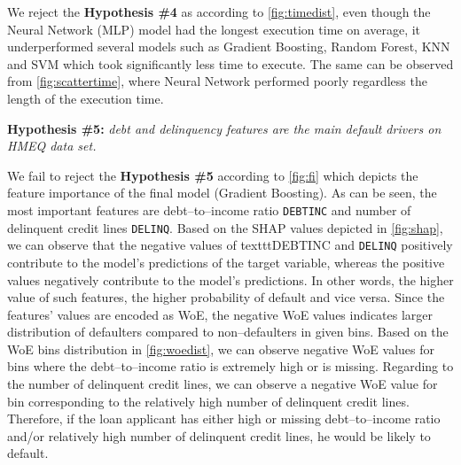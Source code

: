 We reject the \textbf{Hypothesis \#4} as according to \autoref{fig:timedist}, even though the Neural Network (MLP) model had the longest execution time on average, it underperformed several models such as Gradient Boosting, Random Forest, KNN and SVM which took significantly less time to execute. The same can be observed from \autoref{fig:scattertime}, where Neural Network performed poorly regardless the length of the execution time.
\vspace{0.3cm}

\noindent \textbf{Hypothesis \#5:} \textit{ debt and delinquency features are the main default drivers on HMEQ data set.}

We fail to reject the \textbf{Hypothesis \#5} according to \autoref{fig:fi} which depicts the feature importance of the final model (Gradient Boosting). As can be seen, the most important features are debt--to--income ratio \texttt{DEBTINC} and number of delinquent credit lines \texttt{DELINQ}.
Based on the SHAP values depicted in \autoref{fig:shap}, we can observe that the negative values of texttt{DEBTINC} and \texttt{DELINQ} positively contribute to the model's predictions of the target variable, whereas the positive values negatively contribute to the model's predictions.
In other words, the higher value of such features, the higher probability of default and vice versa.
Since the features' values are encoded as WoE, the negative WoE values indicates larger distribution of defaulters compared to non--defaulters in given bins.
Based on the WoE bins distribution in \autoref{fig:woedist}, we can observe negative WoE values for bins where the debt--to--income ratio is extremely high or is missing. Regarding to the number of delinquent credit lines, we can observe a negative WoE value for bin corresponding to the relatively high number of delinquent credit lines.
Therefore, if the loan applicant has either high or missing debt--to--income ratio and/or relatively high number of delinquent credit lines,  he would be likely to default.

